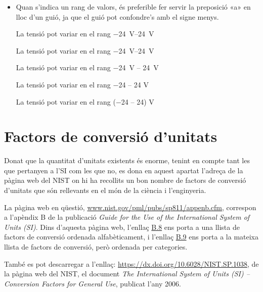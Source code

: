 \begin{itemize}
\item Quan s'indica un rang de valors, és preferible fer servir la preposició «a» en lloc d'un guió, ja que el guió pot confondre's amb el signe menys.

\textcolor{Green}\faCheckSquare{} La tensió pot variar en el rang \qtyrange{-24}{24}{V}

\textcolor{Green}\faCheckSquare{} La tensió pot variar en el rang \qtyrange[range-units = bracket]{-24}{24}{V}

\textcolor{Blue}\faExclamationTriangle{}  La tensió pot variar en el rang \qty{-24}{V} -- \qty{24}{V}

\textcolor{Blue}\faExclamationTriangle{} La tensió pot variar en el rang \num{-24} -- 24 V 

\textcolor{Blue}\faExclamationTriangle{} La tensió pot variar en el rang (\num{-24} -- 24) V 

\end{itemize}


\section{Factors de conversió d'unitats}\label{sec:SI-fact-conv}
Donat que la quantitat d'unitats existents és enorme, tenint en compte tant les que pertanyen a l'SI com les que no, es dona en aquest apartat l'adreça de la pàgina web del NIST on hi ha recollits un bon nombre de factors de conversió d'unitats que són rellevants en el món de la ciència i l'enginyeria.

La pàgina web en  qüestió, \href{http://www.nist.gov/pml/pubs/sp811/appenb.cfm}{www.nist.gov/pml/pubs/sp811/appenb.cfm}, correspon a l'apèndix B de la publicació \textit{Guide for the Use of the International System of Units (SI)}.
Dins d'aquesta pàgina web, l'enllaç \href{http://www.nist.gov/pml/pubs/sp811/appenb8.cfm}{B.8} ens porta a una llista de factors de conversió ordenada alfabèticament, i l'enllaç  \href{http://www.nist.gov/pml/pubs/sp811/appenb9.cfm}{B.9} ens porta a la mateixa llista de factors de conversió, però ordenada per categories.

També es pot descarregar a l'enllaç: \href{https://dx.doi.org/10.6028/NIST.SP.1038}{https://dx.doi.org/10.6028/NIST.SP.1038}, de la pàgina web del NIST, el document \textit{The International System of Units (SI) -- Conversion Factors
for General Use}, publicat l'any 2006.
